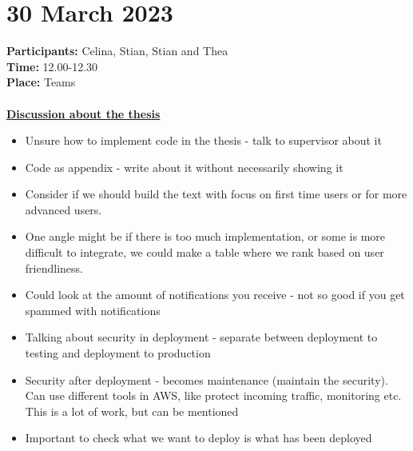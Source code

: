 \section{30 March 2023}
\textbf{Participants:} Celina, Stian, Stian and Thea \\
\textbf{Time:} 12.00-12.30 \\
\textbf{Place:} Teams
\\~\\
\textbf{\underline{Discussion about the thesis}}
\begin{itemize}
    \item Unsure how to implement code in the thesis - talk to supervisor about it
    \item Code as appendix - write about it without necessarily showing it
    \item Consider if we should build the text with focus on first time users or for more advanced users. 
    \item One angle might be if there is too much implementation, or some is more difficult to integrate, we could make a table where we rank based on user friendliness. 
    \item Could look at the amount of notifications you receive - not so good if you get spammed with notifications 
    \item Talking about security in deployment - separate between deployment to testing and deployment to production
    \item Security after deployment - becomes maintenance (maintain the security). Can use different tools in AWS, like protect incoming traffic, monitoring etc. This is a lot of work, but can be mentioned
    \item Important to check what we want to deploy is what has been deployed
\end{itemize} 